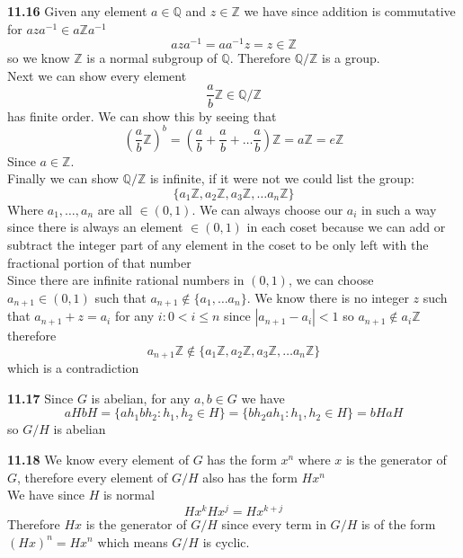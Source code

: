 \documentclass[12pt]{article}
\newenvironment{ques}{\vspace{2 ex}}{\vspace{2 ex}}
\theoremstyle{definition}
\begin{document}
\begin{ques}
	\textbf{11.16}
		Given any element $a \in \mathbb{Q}$ and $z \in \mathbb{Z}$ we
		have since addition is commutative for $aza^{-1} \in a\mathbb{Z}a^{-1}$
		$$aza^{-1} = aa^{-1}z = z \in \mathbb{Z}$$
		so we know $\mathbb{Z}$ is a normal subgroup of $\mathbb{Q}$.
		Therefore $\mathbb{Q} / \mathbb{Z}$ is a group.\\
		Next we can show every element
		$$\frac{a}{b}\mathbb{Z} \in \mathbb{Q}/\mathbb{Z}$$
		has finite order. We can show this by seeing that
		$$(\frac{a}{b}\mathbb{Z})^b = (\frac{a}{b} + \frac{a}{b} +
		\dots \frac{a}{b} )\mathbb{Z} = a\mathbb{Z} = e\mathbb{Z}$$ 
		Since $a \in \mathbb{Z}$.\\
		Finally we can show $\mathbb{Q} / \mathbb{Z}$ is infinite, if it were not
		we could list the group:
		$$\{a_1\mathbb{Z}, a_2\mathbb{Z}, a_3\mathbb{Z}, \dots a_n\mathbb{Z}\}$$
		Where $a_1, \dots , a_n$ are all $\in (0, 1)$. We can always
		choose our $a_i$ in such a way since there is always
		an element $\in (0,1)$ in each coset because we can add or
		subtract the integer part of any element in the coset to be
		only left with the fractional portion of that number\\
		Since there are infinite rational numbers in $(0,1)$, we can
		choose $a_{n+1} \in (0,1)$ such that $a_{n+1} \notin \{a_1,
		\dots a_n\}$. We know there is no integer $z$ such
		that $a_{n+1} + z = a_i$ for any $i: 0 <
		i \leq n$ since $|a_{n+1} - a_i| < 1$ so $a_{n+1} \notin
		a_i\mathbb{Z}$ therefore 
		$$a_{n+1}\mathbb{Z} \notin \{a_1\mathbb{Z}, a_2\mathbb{Z},
		a_3\mathbb{Z}, \dots a_n\mathbb{Z}\}$$
		which is a contradiction
		
\end{ques}

\begin{ques}
	\textbf{11.17}
		Since $G$ is abelian, for any $a, b \in G$ we have
		$$aHbH = \{ah_1bh_2: h_1, h_2 \in H\} = \{bh_2ah_1: h_1, h_2 \in H\} = bHaH$$
		so $G/H$ is abelian
\end{ques}

\begin{ques}
	\textbf{11.18} 
		We know every element of $G$ has the form $x^n$ where $x$ is
		the generator of $G$, therefore every element of $G/H$ also has
		the form $Hx^n$\\
		We have since $H$ is normal 
		$$Hx^{k}Hx^j = Hx^{k+j}$$
		Therefore $Hx$ is the generator of $G/H$ since every term in
		$G/H$ is of the form $(Hx)^n = Hx^n$ which means $G/H$ is
		cyclic.
\end{ques}
\end{document}
